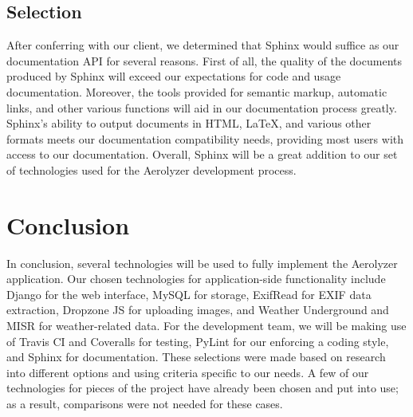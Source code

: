 \documentclass[letterpaper,10pt,draftclsnofoot,onecolumn]{IEEEtran}
\begin{document}
\begin{flushleft}
\subsection{Selection}
After conferring with our client, we determined that Sphinx would suffice as our documentation API for several reasons. First of all, the quality of the documents produced by Sphinx will exceed our expectations for code and usage documentation. Moreover, the tools provided for semantic markup, automatic links, and other various functions will aid in our documentation process greatly. Sphinx’s ability to output documents in HTML, LaTeX, and various other formats meets our documentation compatibility needs, providing most users with access to our documentation. Overall, Sphinx will be a great addition to our set of technologies used for the Aerolyzer development process.

\section{Conclusion}
In conclusion, several technologies will be used to fully implement the Aerolyzer application. Our chosen technologies for application-side functionality include Django for the web interface, MySQL for storage, ExifRead for EXIF data extraction, Dropzone JS for uploading images, and Weather Underground and MISR for weather-related data. For the development team, we will be making use of  Travis CI and Coveralls for testing, PyLint for our enforcing a coding style, and Sphinx for documentation. These selections were made based on research into different options and using criteria specific to our needs. A few of our technologies for pieces of the project have already been chosen and put into use; as a result, comparisons were not needed for these cases.\cite{21} 

\end{flushleft}


\clearpage



\end{document}
